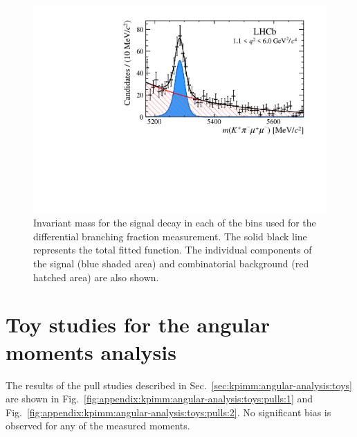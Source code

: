 \begin{figure}[!hb]
\includegraphics[width=0.48\linewidth]{figs/kpimm/massfit/fitKpimumu_q2_1p1_6p0.pdf}
 
\caption{Invariant mass \mkpimm for the signal decay \BdToKpimm in  each of the \qsq bins used for the differential branching fraction measurement. The solid black line represents the total fitted function.  The individual components of the signal (blue shaded area) and combinatorial background (red hatched area) are also shown.}
\label{fig:appendix:massfit:bins}
\end{figure}

\clearpage
\section{Toy studies for the angular moments analysis}
\label{sec:appendix:kpimm:toys}

The results of the pull studies described in Sec.~\ref{sec:kpimm:angular-analysis:toys} are shown in Fig.~\ref{fig:appendix:kpimm:angular-analysis:toys:pulls:1} and Fig.~\ref{fig:appendix:kpimm:angular-analysis:toys:pulls:2}. No significant bias is observed for any of the measured moments.

